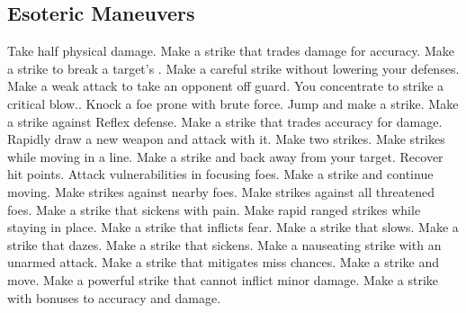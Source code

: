 
\small
\subsection{Esoteric Maneuvers}\label{Esoteric Maneuvers}
\begin{spelllist}
 Take half physical damage.
 Make a strike that trades damage for accuracy.
 Make a strike to break a target's .
 Make a careful strike without lowering your defenses.
 Make a weak attack to take an opponent off guard.
 You concentrate to strike a critical blow..
 Knock a foe prone with brute force.
 Jump and make a strike.
 Make a strike against Reflex defense.
 Make a strike that trades accuracy for damage.
 Rapidly draw a new weapon and attack with it.
 Make two strikes.
 Make strikes while moving in a line.
 Make a strike and back away from your target.
 Recover hit points.
 Attack vulnerabilities in focusing foes.
 Make a strike and continue moving.
 Make strikes against nearby foes.
 Make strikes against all threatened foes.
 Make a strike that sickens with pain.
 Make rapid ranged strikes while staying in place.
 Make a strike that inflicts fear.
 Make a strike that slows.
 Make a strike that dazes.
 Make a strike that sickens.
 Make a nauseating strike with an unarmed attack.
 Make a strike that mitigates miss chances.
 Make a strike and move.
 Make a powerful strike that cannot inflict minor damage.
 Make a strike with bonuses to accuracy and damage.
\end{spelllist}



\small
